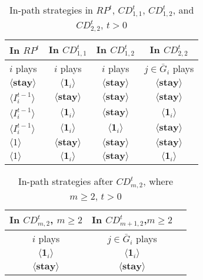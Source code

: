 \documentclass[12pt,letter]{article}
\theoremstyle{definition}
\theoremstyle{remark}
\theoremstyle{claim}
\begin{document}
\begin{table}[ht]
\caption{In-path strategies in $RP^t$, $CD^t_{1,1}$, $CD^t_{1,2}$, and $CD^t_{2,2}$, $t>0$}
\label{Table_stg_cdt12}
\begin{center}
\begin{tabular}{l c c c}
In $RP^t$ 	 	&  	In $CD^t_{1,1}$		&  In $CD^t_{1,2}$	  & In $CD^t_{2,2}$ \\
\hline
\hline
$i$ plays 		                             &  	$i$ plays		&				$i$ plays			& $j\in \bar{G}_i$ plays  \\
\hline
$\langle  \textbf{stay} \rangle$ 	& 	$\langle \mathbf{1}_i \rangle$	&  $\langle \textbf{stay} \rangle$ &  $\langle \textbf{stay} \rangle$ \\
$\langle  {I^{t-1}_i} \rangle$ 		&  $\langle \textbf{stay} \rangle$	&	$\langle \textbf{stay} \rangle$ &  $\langle \textbf{stay} \rangle$   \\
$\langle  {I^{t-1}_i} \rangle$ 		&  $\langle \mathbf{1}_i \rangle$	&	$\langle \textbf{stay} \rangle$ &  $\langle \mathbf{1}_i \rangle$    \\
$\langle  {I^{t-1}_i} \rangle$ 		&  $\langle \mathbf{1}_i \rangle$	&	$\langle \mathbf{1}_i \rangle$ &  $\langle \textbf{stay} \rangle$  \\
$\langle 1 \rangle$ 		             &  $\langle \textbf{stay} \rangle$	&	$\langle \textbf{stay} \rangle$ &  $\langle \textbf{stay} \rangle$\\
$\langle 1 \rangle$ 		             &  $\langle \mathbf{1}_i \rangle$	&	$\langle \textbf{stay} \rangle$ & $\langle \mathbf{1}_i \rangle$
\end{tabular}
\end{center}
\end{table}

\begin{table}[ht]
\caption{In-path strategies after $CD^t_{m,2}$, where $m\geq 2$, $t>0$}
\label{Table_stg_cdtm2}
\begin{center}
\begin{tabular}{c c c}
In $CD^t_{m,2}$, $m\geq 2$ 	 	&  	In $CD^t_{m+1,2}$,$m\geq 2$		& 	\\
\hline
\hline
$i$ plays 		  							&  $j\in \bar{G}_{i}$ plays  								& \\
\hline
$\langle \mathbf{1}_i \rangle$ 	& 	$\langle \mathbf{1}_i \rangle$	    &  \\
$\langle \textbf{stay} \rangle$		&  $\langle \textbf{stay} \rangle$	&  \\

\end{tabular}
\end{center}
\end{table}
\end{document}
